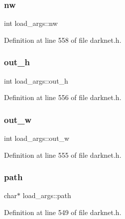 \subsubsection{\texorpdfstring{nw}{nw}}
{\footnotesize\ttfamily int load\+\_\+args\+::nw}



Definition at line 558 of file darknet.\+h.

\mbox{\label{structload__args_aebbded43f56f35f190cd93501cfb8fa3}} 
\subsubsection{\texorpdfstring{out\_h}{out\_h}}
{\footnotesize\ttfamily int load\+\_\+args\+::out\+\_\+h}



Definition at line 556 of file darknet.\+h.

\mbox{\label{structload__args_aac906990c64be46d44ca7c9895eca6ec}} 
\subsubsection{\texorpdfstring{out\_w}{out\_w}}
{\footnotesize\ttfamily int load\+\_\+args\+::out\+\_\+w}



Definition at line 555 of file darknet.\+h.

\mbox{\label{structload__args_a2fe0df26f167df4807c7fb67bf835813}} 
\subsubsection{\texorpdfstring{path}{path}}
{\footnotesize\ttfamily char$\ast$ load\+\_\+args\+::path}



Definition at line 549 of file darknet.\+h.

\mbox{\label{structload__args_aadcafc7eb67b2a86a1a7a6ff2ab80a94}} 
